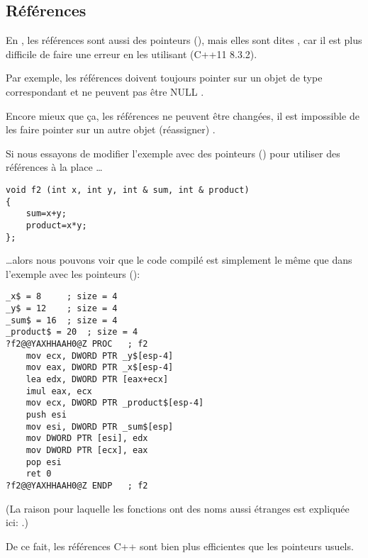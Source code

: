 \subsection{Références}
\label{cpp_references}

En \Cpp, les références sont aussi des pointeurs (), mais
elles sont dites , car il est plus difficile de faire une erreur en les
utilisant (C++11 8.3.2). %

Par exemple, les références doivent toujours pointer sur un objet de type correspondant
et ne peuvent pas être NULL
.

Encore mieux que ça, les références ne peuvent être changées, il est impossible de
les faire pointer sur un autre objet (réassigner)
.

Si nous essayons de modifier l'exemple avec des pointeurs ()
pour utiliser des références à la place \dots

\begin{lstlisting}[style=customc]
void f2 (int x, int y, int & sum, int & product)
{
	sum=x+y;
	product=x*y;
};
\end{lstlisting}

\dots alors nous pouvons voir que le code compilé est simplement le même que dans
l'exemple avec les pointeurs ():

\begin{lstlisting}[caption=MSVC 2010 \Optimizing,style=customasmx86]
_x$ = 8		; size = 4
_y$ = 12	; size = 4
_sum$ = 16	; size = 4
_product$ = 20	; size = 4
?f2@@YAXHHAAH0@Z PROC	; f2
	mov	ecx, DWORD PTR _y$[esp-4]
	mov	eax, DWORD PTR _x$[esp-4]
	lea	edx, DWORD PTR [eax+ecx]
	imul eax, ecx
	mov ecx, DWORD PTR _product$[esp-4]
	push esi
	mov	esi, DWORD PTR _sum$[esp]
	mov	DWORD PTR [esi], edx
	mov	DWORD PTR [ecx], eax
	pop	esi
	ret	0
?f2@@YAXHHAAH0@Z ENDP	; f2
\end{lstlisting}

(La raison pour laquelle les fonctions \Cpp ont des noms aussi étranges est expliquée ici: .)

De ce fait, les références C++ sont bien plus efficientes que les pointeurs usuels.
